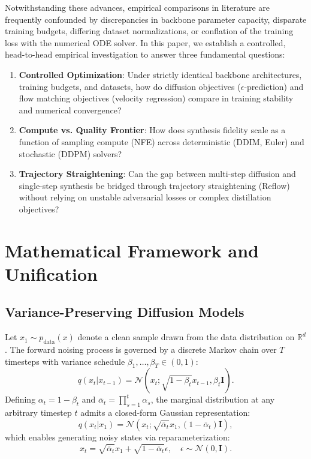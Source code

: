 \documentclass[conference]{IEEEtran}
\begin{document}
Notwithstanding these advances, empirical comparisons in literature are frequently confounded by discrepancies in backbone parameter capacity, disparate training budgets, differing dataset normalizations, or conflation of the training loss with the numerical ODE solver. In this paper, we establish a controlled, head-to-head empirical investigation to answer three fundamental questions:
\begin{enumerate}
    \item \textbf{Controlled Optimization}: Under strictly identical backbone architectures, training budgets, and datasets, how do diffusion objectives ($\epsilon$-prediction) and flow matching objectives (velocity regression) compare in training stability and numerical convergence?
    \item \textbf{Compute vs. Quality Frontier}: How does synthesis fidelity scale as a function of sampling compute (NFE) across deterministic (DDIM, Euler) and stochastic (DDPM) solvers?
    \item \textbf{Trajectory Straightening}: Can the gap between multi-step diffusion and single-step synthesis be bridged through trajectory straightening (Reflow) without relying on unstable adversarial losses or complex distillation objectives?
\end{enumerate}

\section{Mathematical Framework and Unification}

\subsection{Variance-Preserving Diffusion Models}
Let $x_1 \sim p_{\text{data}}(x)$ denote a clean sample drawn from the data distribution on $\mathbb{R}^d$. The forward noising process is governed by a discrete Markov chain over $T$ timesteps with variance schedule $\beta_1, \dots, \beta_T \in (0, 1)$:
\begin{equation}
q(x_t | x_{t-1}) = \mathcal{N}\left(x_t; \sqrt{1 - \beta_t} x_{t-1}, \beta_t \mathbf{I}\right).
\end{equation}
Defining $\alpha_t = 1 - \beta_t$ and $\bar{\alpha}_t = \prod_{s=1}^t \alpha_s$, the marginal distribution at any arbitrary timestep $t$ admits a closed-form Gaussian representation:
\begin{equation}
q(x_t | x_1) = \mathcal{N}\left(x_t; \sqrt{\bar{\alpha}_t} x_1, (1 - \bar{\alpha}_t) \mathbf{I}\right),
\end{equation}
which enables generating noisy states via reparameterization:
\begin{equation}
x_t = \sqrt{\bar{\alpha}_t} x_1 + \sqrt{1 - \bar{\alpha}_t} \epsilon, \quad \epsilon \sim \mathcal{N}(0, \mathbf{I}).
\end{equation}
\end{document}
